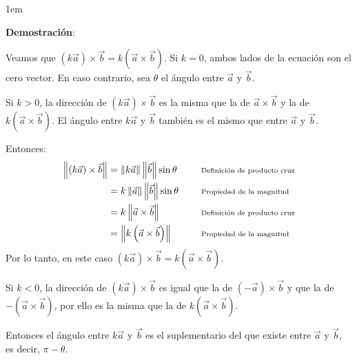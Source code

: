 \documentclass[12pt, fleqn]{report}                             %
\newenvironment{SmallIndentation}[1][0.75em]                    %
        {\begin{adjustwidth}{#1}{}\begin{footnotesize}}             %
        {\end{footnotesize}\end{adjustwidth}}                       %
\DeclareMathOperator \Space {\quad}                             %
\newcommand \Remember[1]{\Space\text{\scriptsize{#1}}}          %
\theoremstyle{break}                                            %
\newcommand{\Wrap}[1]{\left( #1 \right)}                        %
\newcommand{\Abs}[1]{\left\lVert #1 \right\lVert}               %
\begin{document}
\begin{itemize}
                        \begin{SmallIndentation}[1em]
                            \textbf{Demostración}:
                            
                            Veamos que $\Wrap{k \vec{a}} \times \vec{b} = k\Wrap{\vec{a} \times \vec{b}}$.
                            Si $k = 0$, ambos lados de la ecuación son el cero vector.
                            En caso contrario, sea $\theta$ el ángulo entre $\vec{a}$ y $\vec{b}$.
                        
                            Si $k>0$, la dirección de $\Wrap{k \vec{a}} \times \vec{b}$ es la misma que la de
                            $\vec{a} \times \vec{b}$ y la de $k\Wrap{\vec{a} \times \vec{b}}$.
                            El ángulo entre $k\vec{a}$ y $\vec{b}$ también es el mismo que entre $\vec{a}$ y $\vec{b}$.

                            Entonces:
                            \begin{align*}
                                \Abs{(k\vec{a}) \times \vec{b}} 
                                    &= \Abs{k\vec{a}} \Abs{\vec{b}}  \sin \theta    && \Remember{Definición de producto cruz}   \\
                                    &= k \Abs{\vec{a}} \Abs{\vec{b}} \sin \theta    && \Remember{Propiedad de la magnitud}      \\
                                    &= k \Abs{\vec{a} \times \vec{b}}               && \Remember{Definición de producto cruz}   \\
                                    &= \Abs{k\Wrap{\vec{a} \times \vec{b}}}         && \Remember{Propiedad de la magnitud}
                            \end{align*}
                            Por lo tanto, en este caso $\Wrap{k\vec{a}} \times \vec{b} = k\Wrap{\vec{a} \times \vec{b}}$.
                            
                            Si $k < 0$, la dirección de $\Wrap{k\vec{a}} \times \vec{b}$ es igual que la de 
                            $\Wrap{-\vec{a}} \times \vec{b}$ y que la de $-\Wrap{\vec{a} \times \vec{b}}$, por ello
                            es la misma que la de $k\Wrap{\vec{a} \times \vec{b}}$.

                            Entonces el ángulo entre $k\vec{a}$ y $\vec{b}$ es el suplementario del que existe entre
                            $\vec{a}$ y $\vec{b}$, es decir, $\pi-\theta$.


\end{SmallIndentation}
\end{itemize}
\end{document}
